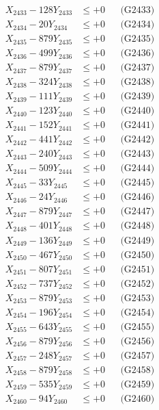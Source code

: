 \documentclass[a4paper,10pt]{article}
\begin{document}
{\begin{align}
X_{2433} - 128Y_{2433} &\leq +0 && \text{(G2433)} \\
X_{2434} - 20Y_{2434} &\leq +0 && \text{(G2434)} \\
X_{2435} - 879Y_{2435} &\leq +0 && \text{(G2435)} \\
X_{2436} - 499Y_{2436} &\leq +0 && \text{(G2436)} \\
X_{2437} - 879Y_{2437} &\leq +0 && \text{(G2437)} \\
X_{2438} - 324Y_{2438} &\leq +0 && \text{(G2438)} \\
X_{2439} - 111Y_{2439} &\leq +0 && \text{(G2439)} \\
X_{2440} - 123Y_{2440} &\leq +0 && \text{(G2440)} \\
\allowbreak
X_{2441} - 152Y_{2441} &\leq +0 && \text{(G2441)} \\
X_{2442} - 441Y_{2442} &\leq +0 && \text{(G2442)} \\
X_{2443} - 240Y_{2443} &\leq +0 && \text{(G2443)} \\
X_{2444} - 509Y_{2444} &\leq +0 && \text{(G2444)} \\
X_{2445} - 33Y_{2445} &\leq +0 && \text{(G2445)} \\
X_{2446} - 24Y_{2446} &\leq +0 && \text{(G2446)} \\
X_{2447} - 879Y_{2447} &\leq +0 && \text{(G2447)} \\
X_{2448} - 401Y_{2448} &\leq +0 && \text{(G2448)} \\
X_{2449} - 136Y_{2449} &\leq +0 && \text{(G2449)} \\
X_{2450} - 467Y_{2450} &\leq +0 && \text{(G2450)} \\
\allowbreak
X_{2451} - 807Y_{2451} &\leq +0 && \text{(G2451)} \\
X_{2452} - 737Y_{2452} &\leq +0 && \text{(G2452)} \\
X_{2453} - 879Y_{2453} &\leq +0 && \text{(G2453)} \\
X_{2454} - 196Y_{2454} &\leq +0 && \text{(G2454)} \\
X_{2455} - 643Y_{2455} &\leq +0 && \text{(G2455)} \\
X_{2456} - 879Y_{2456} &\leq +0 && \text{(G2456)} \\
X_{2457} - 248Y_{2457} &\leq +0 && \text{(G2457)} \\
X_{2458} - 879Y_{2458} &\leq +0 && \text{(G2458)} \\
X_{2459} - 535Y_{2459} &\leq +0 && \text{(G2459)} \\
X_{2460} - 94Y_{2460} &\leq +0 && \text{(G2460)} \\

\end{align}}
\end{document}
